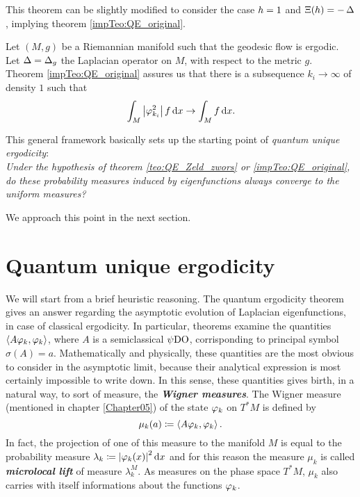This theorem can be slightly modified to consider the case $h=1$ and $\Xi(h)=-\operatorname{\Delta}$, implying theorem \ref{impTeo:QE_original}.


\begin{nese}
\label{ese:equidis}
Let $(M,g)$ be a Riemannian manifold such that the geodesic flow is ergodic. Let $\operatorname{\Delta}=\operatorname{\Delta}_{g}$ the Laplacian operator on $M$, with respect to the metric $g$.\\
Theorem \ref{impTeo:QE_original} assures us that there is a subsequence $k_{i}\to\infty$ of density $1$ such that 
\[
\int_{M}\left| \varphi_{k_{i}}^{2}\right|f\mathop{}\!\mathrm{d} x \rightarrow\int_{M}f\mathop{}\!\mathrm{d} x.
\]
\end{nese}


This general framework basically sets up the starting point of \emph{quantum unique ergodicity}:\\[2mm]
\textit{
Under the hypothesis of theorem \ref{teo:QE_Zeld_zwors} or \ref{impTeo:QE_original}, do these probability measures induced by eigenfunctions always converge to the uniform measures?
}

We approach this point in the next section.



\section{Quantum unique ergodicity}

\label{sec:que_intro}


We will start from a brief heuristic reasoning. The quantum ergodicity theorem gives an answer regarding the asymptotic evolution of Laplacian eigenfunctions, in case of classical ergodicity. In particular, \QE theorems examine the quantities $\left< A\varphi_{k},\varphi_{k}\right>$, where $A$ is a semiclassical $\operatorname{\psi DO}$, corrisponding to principal symbol $\sigma(A)=a$. Mathematically and physically, these quantities are the most obvious to consider in the asymptotic limit, because their analytical expression is most certainly impossible to write down. In this sense, these quantities gives birth, in a natural way, to sort of  measure, the \emph{\textbf{Wigner measures}}. The Wigner measure (mentioned in chapter \ref{Chapter05}) of the state $\varphi_{k}$ on $T^{\ast}M$ is defined by
\begin{equation}
\label{eq:def_wigner_measure}
\mu_{k}(a)\coloneqq\left< A\varphi_{k},\varphi_{k}\right>.
\end{equation}
In fact, the projection of one of this measure to the manifold $M$ is equal to the probability measure $\lambda_{k}\coloneqq\left| \varphi_{k}(x)\right|^{2}\mathop{}\!\mathrm{d} x$ and for this reason the measure $\mu_{k}$ is called \emph{\textbf{microlocal lift}} of measure $\lambda_{k}^{M}$. As measures on the phase space $T^{\ast}M$, $\mu_{k}$ also carries with itself informations about the functions $\varphi_{k}$.

